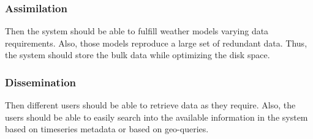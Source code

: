 \subsubsection{Assimilation}
Then the system should be able to fulfill weather models varying data requirements. Also, those models reproduce a large set of redundant data. Thus, the system should store the bulk data while optimizing the disk space.
\subsubsection{Dissemination}
Then different users should be able to retrieve data as they require. Also, the users should be able to easily search into the available information in the system based on timeseries metadata or based on geo-queries.
